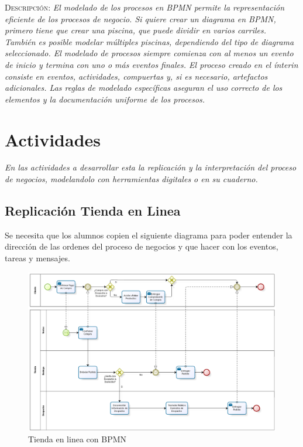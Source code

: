 \documentclass[12pt,letterpaper]{article}
\begin{document}
\par \textsc{Descripción:} \textit{El modelado de los procesos en BPMN permite la representación eficiente de los procesos de negocio. Si quiere crear un diagrama en BPMN, primero tiene que crear una piscina, que puede dividir en varios carriles. También es posible modelar múltiples piscinas, dependiendo del tipo de diagrama seleccionado. El modelado de procesos siempre comienza con al menos un evento de inicio y termina con uno o más eventos finales. El proceso creado en el ínterin consiste en eventos, actividades, compuertas y, si es necesario, artefactos adicionales. Las reglas de modelado específicas aseguran el uso correcto de los elementos y la documentación uniforme de los procesos.}\vspace{2cm}

\section*{\LARGE\textbf{ Actividades}}
\textit{En las actividades a desarrollar esta la replicación y la interpretación del proceso de negocios, modelandolo con herramientas digitales o en su cuaderno.}\\

\subsection{\textbf{Replicación Tienda en Linea}}
Se necesita que los alumnos copien el siguiente diagrama para poder entender la dirección de las ordenes del proceso de negocios y que hacer con los eventos, tareas y mensajes.\\


\begin{landscape}

	\begin{figure}[H]
		\centering
		\includegraphics[scale=0.55]{img/tienda en linea.PNG}    
		\caption{Tienda en linea con BPMN }
	\label{fig:rc}
	\end{figure}

\end{landscape}
	
\end{document}
